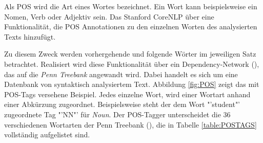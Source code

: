 Als \ac{POS} wird die Art eines Wortes bezeichnet. Ein Wort kann beispielsweise ein Nomen, Verb oder Adjektiv sein. Das Stanford CoreNLP über eine Funktionalität, die \ac{POS} Annotationen zu den einzelnen Worten des analysierten Texts hinzufügt.\par
Zu diesem Zweck werden vorhergehende und folgende Wörter im jeweiligen Satz betrachtet. Realisiert wird diese Funktionalität über ein Dependency-Network (\cite[vgl.][1]{POSTAGGER}), das auf die \textit{Penn Treebank} angewandt wird. Dabei handelt es sich um eine Datenbank von syntaktisch analysiertem Text. Abbildung \ref{fig:POS} zeigt das mit POS-Tags versehene Beispiel. Jedes einzelne Wort, wird einer Wortart anhand einer Abkürzung zugeordnet. Beispielsweise steht der dem Wort "'student"' zugeordnete Tag "'NN"' für \textit{Noun}. Der POS-Tagger unterscheidet die 36 verschiedenen Wortarten der Penn Treebank (\cite[vgl.][3]{PENNTREEBANK}), die in Tabelle \ref{table:POSTAGS} vollständig aufgelistet sind.

